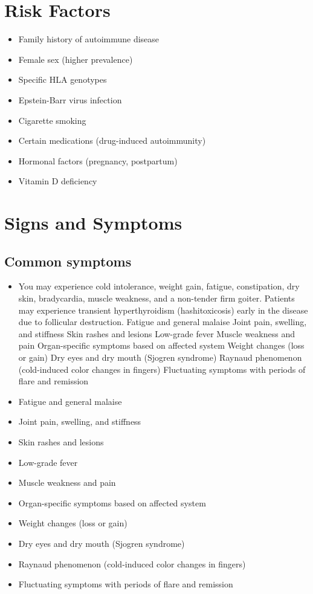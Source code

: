 \section{Risk Factors}

\begin{itemize}[noitemsep]
  \item Family history of autoimmune disease
  \item Female sex (higher prevalence)
  \item Specific HLA genotypes
  \item Epstein-Barr virus infection
  \item Cigarette smoking
  \item Certain medications (drug-induced autoimmunity)
  \item Hormonal factors (pregnancy, postpartum)
  \item Vitamin D deficiency
\end{itemize}
\section{Signs and Symptoms}

\subsection{Common symptoms}
\begin{itemize}[noitemsep]
  \item You may experience cold intolerance, weight gain, fatigue, constipation, dry skin, bradycardia, muscle weakness, and a non-tender firm goiter. Patients may experience transient hyperthyroidism (hashitoxicosis) early in the disease due to follicular destruction. Fatigue and general malaise Joint pain, swelling, and stiffness Skin rashes and lesions Low-grade fever Muscle weakness and pain Organ-specific symptoms based on affected system Weight changes (loss or gain) Dry eyes and dry mouth (Sjogren syndrome) Raynaud phenomenon (cold-induced color changes in fingers) Fluctuating symptoms with periods of flare and remission
  \item Fatigue and general malaise
  \item Joint pain, swelling, and stiffness
  \item Skin rashes and lesions
  \item Low-grade fever
  \item Muscle weakness and pain
  \item Organ-specific symptoms based on affected system
  \item Weight changes (loss or gain)
  \item Dry eyes and dry mouth (Sjogren syndrome)
  \item Raynaud phenomenon (cold-induced color changes in fingers)
  \item Fluctuating symptoms with periods of flare and remission
\end{itemize}

